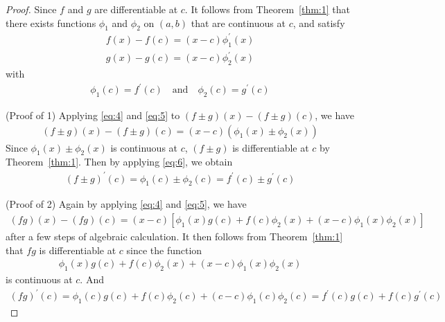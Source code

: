 \documentclass[thmcnt=section, 12pt]{my-elegantbook}
\begin{document}
\begin{proof}
    Since $f$ and $g$ are differentiable at $c$. It follows from Theorem~\ref{thm:1} that there exists functions $\phi_1$ and $\phi_2$ on $(a, b)$ that are continuous at $c$, and satisfy
    \begin{align}
        f(x) - f(c) = (x - c) \phi_1^\prime(x) \label{eq:4}
    \end{align}
    \begin{align}
        g(x) - g(c) = (x - c) \phi_2^\prime(x) \label{eq:5}  
    \end{align}
    with
    \begin{align}
        \phi_1 (c) = f^\prime(c)
        \quad \text{and} \quad 
        \phi_2 (c) = g^\prime(c)
        \label{eq:6}
    \end{align}

    (Proof of 1) Applying \eqref{eq:4} and \eqref{eq:5} to $(f \pm g)(x) - (f \pm g)(c)$, we have 
    \begin{align*}
        (f \pm g)(x) - (f \pm g)(c)
        = (x - c) (
            \phi_1(x) \pm \phi_2(x)
        )
    \end{align*}
    Since $\phi_1(x) \pm \phi_2(x)$ is continuous at $c$, $(f \pm g)$ is differentiable at $c$ by Theorem~\ref{thm:1}. Then by applying \eqref{eq:6}, we obtain
    \begin{align*}
        (f \pm g)^\prime (c)
        = \phi_1(c) \pm \phi_2(c)
        = f^\prime(c) \pm g^\prime(c)
    \end{align*}

    (Proof of 2) Again by applying \eqref{eq:4} and \eqref{eq:5}, we have 
    \begin{align*}
        (f g)(x) - (f g)(c)
        = (x - c) [
            \phi_1(x) g(c) 
            + f(c) \phi_2(x)
            + (x - c) \phi_1(x) \phi_2(x)
        ]
    \end{align*}
    after a few steps of algebraic calculation. It then follows from Theorem~\ref{thm:1} that $f g$ is differentiable at $c$ since the function 
    \begin{align*}
        \phi_1(x) g(c) 
            + f(c) \phi_2(x)
            + (x - c) \phi_1(x) \phi_2(x)
    \end{align*}
    is continuous at $c$. And 
    \begin{align*}
        (f g)^\prime (c)
        = \phi_1(c) g(c) 
        + f(c) \phi_2(c)
        + (c - c) \phi_1(c) \phi_2(c)
        = f^\prime(c) g(c) + f(c) g^\prime(c)
    \end{align*}


\end{proof}
\end{document}
